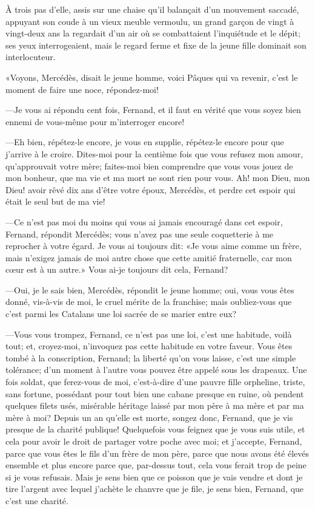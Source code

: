 À trois pas d'elle, assis sur une chaise qu'il balançait d'un mouvement saccadé, appuyant son coude à un vieux meuble vermoulu, un grand garçon de vingt à vingt-deux ans la regardait d'un air où se combattaient l'inquiétude et le dépit; ses yeux interrogeaient, mais le regard ferme et fixe de la jeune fille dominait son interlocuteur.

«Voyons, Mercédès, disait le jeune homme, voici Pâques qui va revenir, c'est le moment de faire une noce, répondez-moi!

—Je vous ai répondu cent fois, Fernand, et il faut en vérité que vous soyez bien ennemi de vous-même pour m'interroger encore!

—Eh bien, répétez-le encore, je vous en supplie, répétez-le encore pour que j'arrive à le croire. Dites-moi pour la centième fois que vous refusez mon amour, qu'approuvait votre mère; faites-moi bien comprendre que vous vous jouez de mon bonheur, que ma vie et ma mort ne sont rien pour vous. Ah! mon Dieu, mon Dieu! avoir rêvé dix ans d'être votre époux, Mercédès, et perdre cet espoir qui était le seul but de ma vie!

—Ce n'est pas moi du moins qui vous ai jamais encouragé dans cet espoir, Fernand, répondit Mercédès; vous n'avez pas une seule coquetterie à me reprocher à votre égard. Je vous ai toujours dit: «Je vous aime comme un frère, mais n'exigez jamais de moi autre chose que cette amitié fraternelle, car mon cœur est à un autre.» Vous ai-je toujours dit cela, Fernand?

—Oui, je le sais bien, Mercédès, répondit le jeune homme; oui, vous vous êtes donné, vis-à-vis de moi, le cruel mérite de la franchise; mais oubliez-vous que c'est parmi les Catalans une loi sacrée de se marier entre eux?

—Vous vous trompez, Fernand, ce n'est pas une loi, c'est une habitude, voilà tout; et, croyez-moi, n'invoquez pas cette habitude en votre faveur. Vous êtes tombé à la conscription, Fernand; la liberté qu'on vous laisse, c'est une simple tolérance; d'un moment à l'autre vous pouvez être appelé sous les drapeaux. Une fois soldat, que ferez-vous de moi, c'est-à-dire d'une pauvre fille orpheline, triste, sans fortune, possédant pour tout bien une cabane presque en ruine, où pendent quelques filets usés, misérable héritage laissé par mon père à ma mère et par ma mère à moi? Depuis un an qu'elle est morte, songez donc, Fernand, que je vis presque de la charité publique! Quelquefois vous feignez que je vous suis utile, et cela pour avoir le droit de partager votre poche avec moi; et j'accepte, Fernand, parce que vous êtes le fils d'un frère de mon père, parce que nous avons été élevés ensemble et plus encore parce que, par-dessus tout, cela vous ferait trop de peine si je vous refusais. Mais je sens bien que ce poisson que je vais vendre et dont je tire l'argent avec lequel j'achète le chanvre que je file, je sens bien, Fernand, que c'est une charité.

